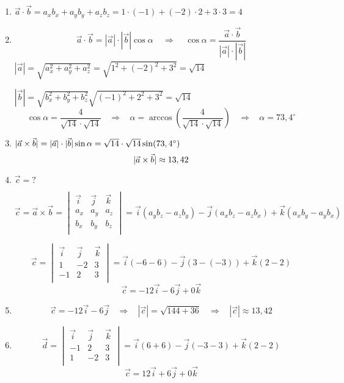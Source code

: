 


\begin{enumerate}[label=\alph*)]
 \item $\vec{a} \cdot \vec{b}=a_xb_x+a_yb_y+a_zb_z=1\cdot(-1)+(-2)\cdot2+3\cdot3=4  $
 \item   $$\vec{a} \cdot \vec{b}=|\vec{a}| \cdot| \vec{b}|\cos\alpha \ \ \ \ \ \Rightarrow  \ \ \ \ \  \cos\alpha=\frac{\vec{a} \cdot \vec{b}}{|\vec{a}| \cdot| \vec{b}|}$$
 $|\vec{a}|=\sqrt{a_x^2+a_y^2+a_z^2}=\sqrt{1^2+(-2)^2+3^2}=\sqrt{14}$
 
 $|\vec{b}|=\sqrt{b_x^2+b_y^2+b_z^2}\sqrt{(-1)^2+2^2+3^2}=\sqrt{14}$
 $$\cos\alpha=\frac{4}{\sqrt{14}\cdot\sqrt{14}} \ \ \ \ \Rightarrow  \ \ \ \  \alpha=\arccos \left( \frac{4}{\sqrt{14} \cdot \sqrt{14}} \right) 
  \ \ \ \ \Rightarrow  \ \ \ \   \alpha=73,4^\circ$$
 
 
 
 \item $\arrowvert \vec{a} \times \vec{b}  \arrowvert =  |\vec{a}| \cdot| \vec{b}|\sin\alpha =\sqrt{14}\cdot\sqrt{14} \sin(73,4^\circ)   $
 $$\arrowvert \vec{a} \times \vec{b}  \arrowvert \approx 13,42$$
 
 
 \item $  \vec{c} =?$
 
 $$\vec{c}=\vec{a} \times \vec{b}=
 \begin{vmatrix}
  \vec{i} & \vec{j} & \vec{k} \\
  a_x  & a_y  & a_z  \\
  b_x  & b_y  & b_z  \\
 \end{vmatrix}
 =\vec{i}(a_yb_z-a_zb_y)-\vec{j}(a_xb_z-a_zb_x) + \vec{k}(a_xb_y-a_yb_x)
 $$
 
 $$\vec{c}=
 \begin{vmatrix}
   \vec{i} & \vec{j} & \vec{k} \\
   1 & -2 & 3 \\
   -1 & 2 & 3 \\
 \end{vmatrix}
 =\vec{i}(-6-6)-\vec{j}(3-(-3))+ \vec{k}(2-2) $$
  $$\vec{c}= -12\vec{i}-6\vec{j} + 0\vec{k}$$
 \item 
 $$\vec{c}= -12\vec{i}-6\vec{j}  \ \ \ \ \Rightarrow  \ \ \ \ |\vec{c}|=\sqrt{144+36} \ \ \ \ \Rightarrow  \ \ \ \ |\vec{c}|\approx13,42 $$
 \item 
 $$\vec{d}=
 \begin{vmatrix}
   \vec{i} & \vec{j} & \vec{k} \\
   -1 & 2 & 3 \\
   1 & -2 & 3 \\
 \end{vmatrix}
 =\vec{i}(6+6)-\vec{j}(-3-3)+ \vec{k}(2-2) $$
  $$\vec{c}= 12\vec{i}+6\vec{j} + 0\vec{k}$$

\end{enumerate}
